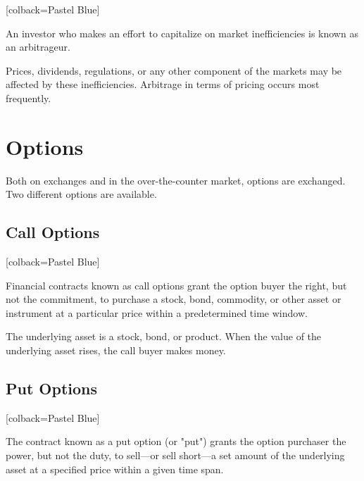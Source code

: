 \begin{tcolorbox}
	[colback=Pastel Blue]
	\begin{definition}
		An investor who makes an effort to capitalize on market inefficiencies is known as an arbitrageur.
	\end{definition}
\end{tcolorbox}

\noindent Prices, dividends, regulations, or any other component of the markets may be affected by these inefficiencies. Arbitrage in terms of pricing occurs most frequently.
\section{Options}
\noindent Both on exchanges and in the over-the-counter market, options are exchanged. Two different options are available.
\subsection{Call Options}

\begin{tcolorbox}
	[colback=Pastel Blue]
	\begin{definition}
		Financial contracts known as call options grant the option buyer the right, but not the commitment, to purchase a stock, bond, commodity, or other asset or instrument at a particular price within a predetermined time window. 
	\end{definition}
\end{tcolorbox}

\noindent The underlying asset is a stock, bond, or product. When the value of the underlying asset rises, the call buyer makes money.
\subsection{Put Options}

\begin{tcolorbox}
	[colback=Pastel Blue]
	\begin{definition}
		The contract known as a put option (or "put") grants the option purchaser the power, but not the duty, to sell—or sell short—a set amount of the underlying asset at a specified price within a given time span.
	\end{definition}
\end{tcolorbox}

